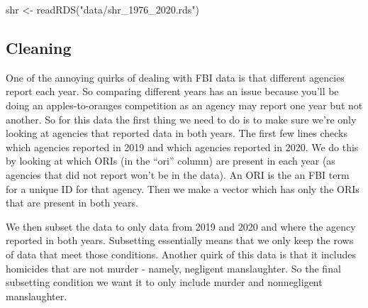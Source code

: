 \documentclass[
]{krantz}
\makeatletter
\newenvironment{Shaded}{\begin{snugshade}}{\end{snugshade}}
\newcommand{\FunctionTok}[1]{\textcolor[rgb]{0,0,0}{#1}}
\newcommand{\NormalTok}[1]{#1}
\newcommand{\OtherTok}[1]{\textcolor[rgb]{0.37,0.37,0.37}{#1}}
\newcommand{\StringTok}[1]{\textcolor[rgb]{0.5,0.5,0.5}{#1}}
\newenvironment{kframe}{%
\medskip{}
\setlength{\fboxsep}{.8em}
 \def\at@end@of@kframe{}%
 \ifinner\ifhmode%
  \def\at@end@of@kframe{\end{minipage}}%
  \begin{minipage}{\columnwidth}%
 \fi\fi%
 \def\FrameCommand##1{\hskip\@totalleftmargin \hskip-\fboxsep
 \colorbox{shadecolor}{##1}\hskip-\fboxsep
     \hskip-\linewidth \hskip-\@totalleftmargin \hskip\columnwidth}%
 \MakeFramed {\advance\hsize-\width
   \@totalleftmargin\z@ \linewidth\hsize
   \@setminipage}}%
 {\par\unskip\endMakeFramed%
 \at@end@of@kframe}
\renewenvironment{Shaded}{\begin{kframe}}{\end{kframe}}
\makeatother
\begin{document}
\begin{Shaded}
\begin{Highlighting}[]
\NormalTok{shr }\OtherTok{\textless{}{-}} \FunctionTok{readRDS}\NormalTok{(}\StringTok{"data/shr\_1976\_2020.rds"}\NormalTok{) }
\end{Highlighting}
\end{Shaded}

\hypertarget{cleaning}{%
\subsection{Cleaning}\label{cleaning}}

One of the annoying quirks of dealing with FBI data is that different agencies report each year. So comparing different years has an issue because you'll be doing an apples-to-oranges competition as an agency may report one year but not another. So for this data the first thing we need to do is to make sure we're only looking at agencies that reported data in both years. The first few lines checks which agencies reported in 2019 and which agencies reported in 2020. We do this by looking at which ORIs (in the ``ori'' column) are present in each year (as agencies that did not report won't be in the data). An ORI is the an FBI term for a unique ID for that agency. Then we make a vector which has only the ORIs that are present in both years.

We then subset the data to only data from 2019 and 2020 and where the agency reported in both years. Subsetting essentially means that we only keep the rows of data that meet those conditions. Another quirk of this data is that it includes homicides that are not murder - namely, negligent manslaughter. So the final subsetting condition we want it to only include murder and nonnegligent manslaughter.
\end{document}
